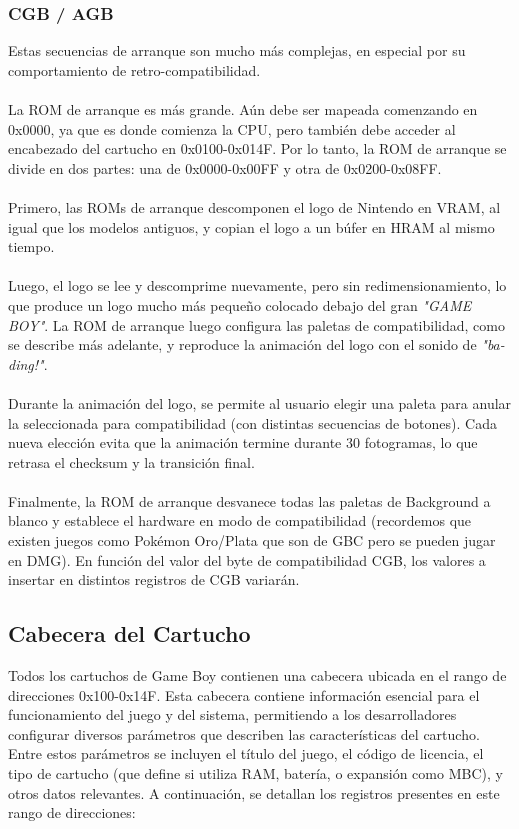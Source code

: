 \subsubsection{CGB / AGB}
Estas secuencias de arranque son mucho más complejas, en especial por su comportamiento de retro-compatibilidad.
\\\\
La ROM de arranque es más grande. Aún debe ser mapeada comenzando en 0x0000, ya que es donde comienza la CPU, pero también debe acceder al encabezado del cartucho en 0x0100-0x014F. Por lo tanto, la ROM de arranque se divide en dos partes: una de 0x0000-0x00FF y otra de 0x0200-0x08FF.
\\\\
Primero, las ROMs de arranque descomponen el logo de Nintendo en VRAM, al igual que los modelos antiguos, y copian el logo a un búfer en HRAM al mismo tiempo.
\\\\
Luego, el logo se lee y descomprime nuevamente, pero sin redimensionamiento, lo que produce un logo mucho más pequeño colocado debajo del gran \textit{"GAME BOY"}. La ROM de arranque luego configura las paletas de compatibilidad, como se describe más adelante, y reproduce la animación del logo con el sonido de \textit{"ba-ding!"}.
\\\\
Durante la animación del logo, se permite al usuario elegir una paleta para anular la seleccionada para compatibilidad (con distintas secuencias de botones). Cada nueva elección evita que la animación termine durante 30 fotogramas, lo que retrasa el checksum y la transición final.
\\\\
Finalmente, la ROM de arranque desvanece todas las paletas de Background a blanco y establece el hardware en modo de compatibilidad (recordemos que existen juegos como Pokémon Oro/Plata que son de GBC pero se pueden jugar en DMG). En función del valor del byte de compatibilidad CGB, los valores a insertar en distintos registros de CGB variarán.

\subsection{Cabecera del Cartucho}

Todos los cartuchos de Game Boy contienen una cabecera ubicada en el rango de direcciones 0x100-0x14F. Esta cabecera contiene información esencial para el funcionamiento del juego y del sistema, permitiendo a los desarrolladores configurar diversos parámetros que describen las características del cartucho. Entre estos parámetros se incluyen el título del juego, el código de licencia, el tipo de cartucho (que define si utiliza RAM, batería, o expansión como MBC), y otros datos relevantes. A continuación, se detallan los registros presentes en este rango de direcciones:

